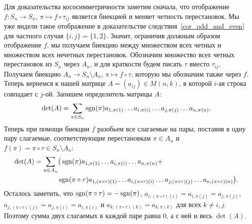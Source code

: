 Для доказательства кососимметричности заметим сначала, что отображение
$f\colon S_n\to S_n$, $\pi\mapsto f\circ\tau_{ij}$ является биекцией и
меняет четность перестановок. Мы уже видели такое отображение в
доказательстве следствия~\ref{cor_odd_and_even} для частного случая
$\{i,j\}=\{1,2\}$. Значит, ограничив должным образом отображение $f$,
мы получаем биекцию между множеством всех четных и множеством всех
нечетных перестановок. Обозначим множество всех четных перестановок из
$S_n$ через $A_n$, и для краткости будем писать $\tau$ вместо
$\tau_{ij}$. Получаем биекцию $A_n\to S_n\setminus A_n$,
$\pi\mapsto f\circ\tau$, которую мы обозначим также через $f$.
Теперь вернемся к нашей матрице $A=(a_{ij})\in M(n,k)$, в которой
$i$-ая строка совпадает с $j$-ой. Запишем определитель матрицы $A$:
$$
\det(A)=\sum_{\pi\in S_n}\operatorname{sgn}(\pi)a_{1,\pi(1)}\dots a_{i,\pi(i)}\dots
a_{j,\pi(j)}\dots a_{n,\pi(n)}.
$$
Теперь при помощи биекции $f$ разобьем все слагаемые на пары, поставив
в одну пару слагаемые, соответствующие перестановкам $\pi\in A_n$ и
$f(\pi)=\pi\circ\tau\in S_n\setminus A_n$:
\begin{align*}
\det(A)=\sum_{\pi\in A_n} & \big(\operatorname{sgn}(\pi)a_{1,\pi(1)}\dots
  a_{i,\pi(i)}\dots a_{n,\pi(n)} +\\
  & \operatorname{sgn}(\pi\circ\tau)a_{1,(\pi\circ\tau)(1)}\dots
  a_{i,(\pi\circ\tau)(i)}\dots a_{j,(\pi\circ\tau)(j)}\dots
  a_{n,(\pi\circ\tau)(n)} \big).\\
\end{align*}
Осталось заметить, что $\operatorname{sgn}(\pi\circ\tau)=-\operatorname{sgn}(\pi)$,
$a_{i,(\pi\circ\tau)(i)}=a_{i,\pi(j)}=a_{j,\pi(j)}$,
$a_{j,(\pi\circ\tau)(j)}=a_{j,\pi(i)}=a_{i,\pi(i)}$ и
$a_{k,(\pi\circ\tau)(k)}=a_{k,\pi(k)}$ для всех $k\neq i,j$. Поэтому
сумма двух слагаемых в каждой паре равна $0$, а с ней и весь
$\det(A)$.

